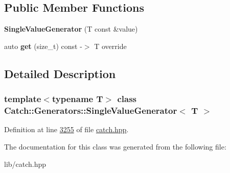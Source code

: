 \subsection*{Public Member Functions}
\begin{DoxyCompactItemize}
\item 
\mbox{\label{classCatch_1_1Generators_1_1SingleValueGenerator_a4bed2ad14ffe04102d8135e2c82b3ace}} 
{\bfseries Single\+Value\+Generator} (T const \&value)
\item 
\mbox{\label{classCatch_1_1Generators_1_1SingleValueGenerator_ad03af3fe263136425595bfd2eec84209}} 
auto {\bfseries get} (size\+\_\+t) const -\/$>$ T override
\end{DoxyCompactItemize}


\subsection{Detailed Description}
\subsubsection*{template$<$typename T$>$\newline
class Catch\+::\+Generators\+::\+Single\+Value\+Generator$<$ T $>$}



Definition at line \mbox{\hyperlink{catch_8hpp_source_l03255}{3255}} of file \mbox{\hyperlink{catch_8hpp_source}{catch.\+hpp}}.



The documentation for this class was generated from the following file\+:\begin{DoxyCompactItemize}
\item 
lib/catch.\+hpp\end{DoxyCompactItemize}
